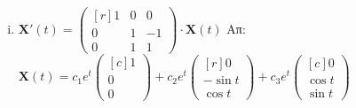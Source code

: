 \begin{enumerate}
\begin{enumerate}[i)]
 \item $ \mathbf{X}'(t) = 
	 \begin{pmatrix*}[r]
		 1 & 0 & 0 \\
		 0 & 1 & -1 \\
		 0 & 1 & 1
	 \end{pmatrix*} \cdot 
	 \mathbf{X}(t) $
	 \hfill Απ: {\scriptsize $ \mathbf{X}(t) = c_{1}e^{t} 
	 \begin{pmatrix*}[c] 1 \\ 0 \\ 0 \end{pmatrix*} + c_{2}e^{t} 
	 \begin{pmatrix*}[r] 0 \\ - \sin{t} \\ \cos{t}  \end{pmatrix*} + c_{3}e^{t} 
 \begin{pmatrix*}[c] 0 \\ \cos{t} \\ \sin{t}   \end{pmatrix*}$} 
		\end{enumerate}


\end{enumerate}


